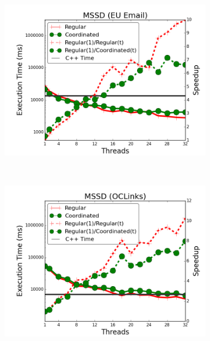 
\begin{figure}[]
        \centering
        \begin{subfigure}[b]{\plotsize\textwidth}
                \includegraphics[width=\textwidth]{experiments/coordination/unbuffered-shortest-email.png}
                \label{fig:coordination:coord_unbuffered_sssp_email}
        \end{subfigure}
        ~
        \begin{subfigure}[b]{\plotsize\textwidth}
                \includegraphics[width=\textwidth]{experiments/coordination/unbuffered-shortest-oclinks.png}

\end{subfigure}
\end{figure}
